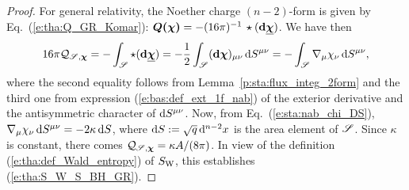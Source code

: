 \begin{proof}
For general relativity, the Noether charge $(n-2)$-form is given by Eq.~(\ref{e:tha:Q_GR_Komar}):
$\bm{Q}\textbf{(}\bm{\chi}\textbf{)} = - (16\pi)^{-1}\, \star (\mathbf{d} \underline{\bm{\chi}})$. We have then
\[
   16\pi  \mathcal{Q}_{\mathscr{S},\bm{\chi}} = - \int_{\mathscr{S}}  \star (\mathbf{d} \underline{\bm{\chi}})
    = - \frac{1}{2} \int_{\mathscr{S}} (\mathbf{d}\bm{\chi})_{\mu\nu} \, \mathrm{d} S^{\mu\nu}
    = - \int_{\mathscr{S}} \nabla_\mu \chi_\nu  \, \mathrm{d} S^{\mu\nu} ,
\]
where the second equality follows from Lemma~\ref{p:sta:flux_integ_2form}
and the third one from expression (\ref{e:bas:def_ext_1f_nab}) of the exterior
derivative and the antisymmetric character of $\mathrm{d} S^{\mu\nu}$.
Now, from Eq.~(\ref{e:sta:nab_chi_DS}),
$\nabla_\mu \chi_\nu  \, \mathrm{d} S^{\mu\nu} = -2 \kappa \, \mathrm{d} S$,
where $\mathrm{d} S := \sqrt{q}\, \mathrm{d}^{n-2} x$ is the area element of $\mathscr{S}$. Since $\kappa$
is constant, there comes $\mathcal{Q}_{\mathscr{S},\bm{\chi}}  = \kappa A/(8\pi)$.
In view of the definition (\ref{e:tha:def_Wald_entropy}) of $S_{\rm W}$,
this establishes (\ref{e:tha:S_W_S_BH_GR}).
\end{proof}

